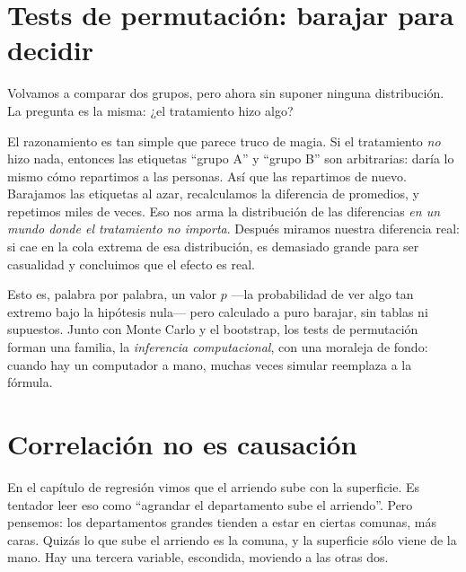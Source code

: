 \section{Tests de permutación: barajar para decidir}

Volvamos a comparar dos grupos, pero ahora sin suponer ninguna distribución. La pregunta es la misma: ¿el tratamiento hizo algo?

El razonamiento es tan simple que parece truco de magia. Si el tratamiento \emph{no} hizo nada, entonces las etiquetas \enquote{grupo A} y \enquote{grupo B} son arbitrarias: daría lo mismo cómo repartimos a las personas. Así que las repartimos de nuevo. Barajamos las etiquetas al azar, recalculamos la diferencia de promedios, y repetimos miles de veces. Eso nos arma la distribución de las diferencias \emph{en un mundo donde el tratamiento no importa}. Después miramos nuestra diferencia real: si cae en la cola extrema de esa distribución, es demasiado grande para ser casualidad y concluimos que el efecto es real.

Esto es, palabra por palabra, un valor \(p\) —la probabilidad de ver algo tan extremo bajo la hipótesis nula— pero calculado a puro barajar, sin tablas ni supuestos. Junto con Monte Carlo y el bootstrap, los tests de permutación forman una familia, la \emph{inferencia computacional}, con una moraleja de fondo: cuando hay un computador a mano, muchas veces simular reemplaza a la fórmula.

\section{Correlación no es causación}

En el capítulo de regresión vimos que el arriendo sube con la superficie. Es tentador leer eso como \enquote{agrandar el departamento sube el arriendo}. Pero pensemos: los departamentos grandes tienden a estar en ciertas comunas, más caras. Quizás lo que sube el arriendo es la comuna, y la superficie sólo viene de la mano. Hay una tercera variable, escondida, moviendo a las otras dos.

\begin{center}
\end{center}

